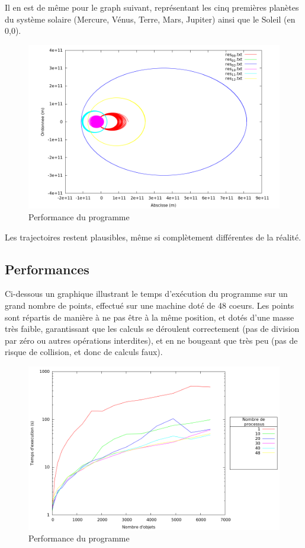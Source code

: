 \documentclass[a4paper,11pt]{article}
\begin{document}
Il en est de même pour le graph suivant, représentant les cinq premières planètes du système solaire (Mercure, Vénus, Terre, Mars, Jupiter) ainsi que le Soleil (en 0,0).
\begin{figure}[h!]
  \centering
  \includegraphics[width=\textwidth]{systeme.png}
  \caption{Performance du programme}
  \label{perf}
\end{figure}
Les trajectoires restent plausibles, même si complètement différentes de la réalité.  
\subsection{Performances}
Ci-dessous un graphique illustrant le temps d'exécution du programme sur un grand nombre de points, effectué sur une machine doté de 48 coeurs. 
Les points sont répartis de manière à ne pas être à la même position, et dotés d'une masse très faible, garantissant que les calculs se déroulent correctement (pas de division par zéro ou autres opérations interdites), et en ne bougeant que très peu (pas de risque de collision, et donc de calculs faux). 

\begin{figure}[h!]
  \centering
  \includegraphics[width=\textwidth]{perf.png}
  \caption{Performance du programme}
  \label{perf}
\end{figure}
\end{document}
